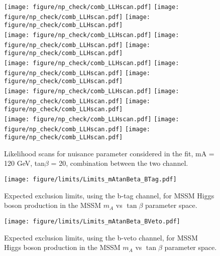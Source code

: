 \begin{figure}[htp]
     \begin{center}

            \texttt{[image: figure/np\_check/comb\_LLHscan.pdf]}
            \texttt{[image: figure/np\_check/comb\_LLHscan.pdf]}
            \texttt{[image: figure/np\_check/comb\_LLHscan.pdf]}\\
            \texttt{[image: figure/np\_check/comb\_LLHscan.pdf]}
            \texttt{[image: figure/np\_check/comb\_LLHscan.pdf]}
            \texttt{[image: figure/np\_check/comb\_LLHscan.pdf]}\\
            \texttt{[image: figure/np\_check/comb\_LLHscan.pdf]}
            \texttt{[image: figure/np\_check/comb\_LLHscan.pdf]}
            \texttt{[image: figure/np\_check/comb\_LLHscan.pdf]}\\
            \texttt{[image: figure/np\_check/comb\_LLHscan.pdf]}
            \texttt{[image: figure/np\_check/comb\_LLHscan.pdf]}
            \texttt{[image: figure/np\_check/comb\_LLHscan.pdf]}\\
            \texttt{[image: figure/np\_check/comb\_LLHscan.pdf]}
            \texttt{[image: figure/np\_check/comb\_LLHscan.pdf]}
            \texttt{[image: figure/np\_check/comb\_LLHscan.pdf]}\\

    \end{center}
    \caption{ Likelihood scans for nuisance parameter considered in the fit,  mA = 120 GeV, tan$\beta$ = 20, combination between the two channel.} 
    \label{fig:llh_3}
\end{figure}

\begin{figure}[]
  \centering
  \texttt{[image: figure/limits/Limits\_mAtanBeta\_BTag.pdf]}
  \caption{Expected %
  exclusion limits, using the b-tag channel, for MSSM Higgs boson production 
in the MSSM $m_A$ vs $\tan\beta$ parameter space.}
\label{fig:limit_extract_combined}
\end{figure}

\begin{figure}[]
  \centering
  \texttt{[image: figure/limits/Limits\_mAtanBeta\_BVeto.pdf]}
  \caption{Expected %
  exclusion limits, using the b-veto channel, for MSSM Higgs boson production 
in the MSSM $m_A$ vs $\tan\beta$ parameter space.}
\label{fig:limit_extract_combined}
\end{figure}

